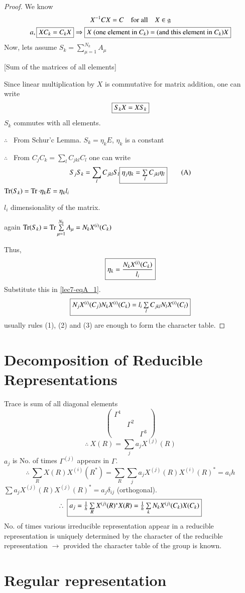 \begin{proof}
We know
\begin{gather*}
X^{-1}CX=C\quad\text{for all}\quad X\in \mathfrak{g}\\
a, \fbox{$XC_{k}=C_{k}X$}\Rightarrow \fbox{$X$ (one element in $C_{k}$) = (and this element in $C_{k}$)$X$}
\end{gather*}
Now, lets assume $S_{k}=\sum\limits^{N_{k}}_{\mu=1}A_{\mu}$ 

[Sum of the matrices of all elements]

Since linear multiplication by $X$ is commutative for matrix addition, one can write
$$
\fbox{$S_{k}X=XS_{k}$}
$$
$S_{k}$ commutes with all elements.

$\therefore$ \ From Schur'c Lemma. $S_{k}=\eta_{k}E$, $\eta_{k}$ is a constant

$\therefore$ \ From $C_{j}C_{k}=\sum\limits_{l}C_{jkl}C_{l}$ one can write
\begin{equation*}
S_{j}S_{k}=\sum\limits_{l}C_{jkl}S_{l} \fbox{$\eta_{j}\eta_{k}=\sum\limits_{l}C_{jkl}\eta_{l}$}\tag{A}\label{lec7-eqA_1}
\end{equation*}
$\operatorname{Tr}(S_{k})=\operatorname{Tr}\cdot \eta_{k}E=\eta_{k}l_{i}$

$l_{i}$ dimensionality of the matrix.

again $\operatorname{Tr}(S_{k})=\operatorname{Tr}\sum\limits^{N_{k}}_{\mu=1}A_{\mu}=N_{k}X^{(i)}(C_{k})$

Thus,
$$
\fbox{$\eta_{k}=\dfrac{N_{k}X^{(i)}(C_{k})}{l_{i}}$}
$$
Substitute this in \eqref{lec7-eqA_1}.
$$
\fbox{$N_{j}X^{(i)}(C_{j})N_{k}X^{(i)}(C_{k})=l_{i}\sum\limits_{l}C_{jkl}N_{l}X^{(i)}(C_{l})$}
$$
usually rules (1), (2) and (3) are enough to form the character table.
\end{proof}

\section*{Decomposition of Reducible Representations}

Trace is sum of all diagonal elements
$$
\left(
\begin{matrix}
\Gamma^{1} & & \\
 & \Gamma^{2} & \\
 & & \Gamma^{3}
\end{matrix}
\right)
$$
$$
\therefore \ X(R)=\sum\limits_{j}a_{j}X^{(j)}(R)
$$
$a_{j}$ is No. of times $\Gamma^{(j)}$ appears in $\Gamma$.
$$
\therefore \ \sum\limits_{R}X(R)X^{(i)}(R^{*})=\sum\limits_{R}\sum\limits_{j}a_{j}X^{(j)}(R)X^{(i)}(R)^{*}=a_{i}h
$$
$\sum a_{j}X^{(j)}(R)X^{(j)}(R)^{*}=a_{j}\delta_{ij}$ (orthogonal).
$$
\therefore \ \fbox{$a_{j}=\frac{1}{h}\sum\limits_{R}X^{(j)}(R)^{*}X(R)=\frac{1}{h}\sum\limits_{k}N_{k}X^{(j)}(C_{k})X(C_{k})$}
$$
No. of times various irreducible representation appear in a reducible representation is uniquely determined by the character of the reducible representation $\to$ provided the character table of the group is known.

\section*{Regular representation}


